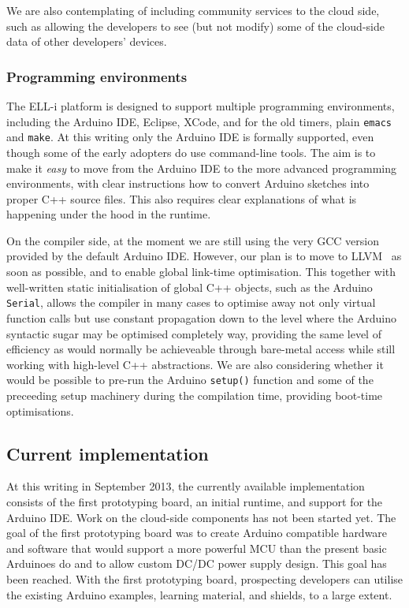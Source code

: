 \documentclass[draft,a4paper]{siamltex}
\begin{document}
We are also contemplating of including community services to the cloud
side, such as allowing the developers to see (but not modify) some of
the cloud-side data of other developers' devices.

\subsubsection{Programming environments}

The ELL-i platform is designed to support multiple programming
environments, including the Arduino IDE, Eclipse, XCode, and for the
old timers, plain \hbox{\tt emacs} and \hbox{\tt make}.  At this
writing only the Arduino IDE is formally supported, even though some
of the early adopters do use command-line tools.  The aim is to make
it {\it easy} to move from the Arduino IDE to the more advanced
programming environments, with clear instructions how to convert
Arduino sketches into proper C++ source files.  This also requires
clear explanations of what is happening under the hood in the runtime.

On the compiler side, at the moment we are still using the very GCC
version provided by the default Arduino IDE.  However, our plan is to
move to LLVM~\cite{LLVM} as soon as possible, and to enable global
link-time optimisation.  This together with well-written static
initialisation of global C++ objects, such as the Arduino \hbox{\tt
  Serial}, allows the compiler in many cases to optimise away not only
virtual function calls but use constant propagation down to the level
where the Arduino syntactic sugar may be optimised completely way,
providing the same level of efficiency as would normally be
achieveable through bare-metal access while still working with
high-level C++ abstractions.  We are also considering whether it would
be possible to pre-run the Arduino \hbox{\tt setup()} function and
some of the preceeding setup machinery during the compilation
time\cite{Rinta-aho_et_al}, providing boot-time optimisations.

\subsection{Current implementation}

At this writing in September 2013, the currently available
implementation consists of the first prototyping board, an initial
runtime, and support for the Arduino IDE.  Work on the cloud-side
components has not been started yet.
The goal of the first prototyping board was to create Arduino
compatible hardware and software that would support a more powerful
MCU than the present basic Arduinoes do and to allow custom DC/DC
power supply design.  This goal has been reached.  With the first
prototyping board, prospecting developers can utilise the existing
Arduino examples, learning material, and shields, to a large extent.
\end{document}
